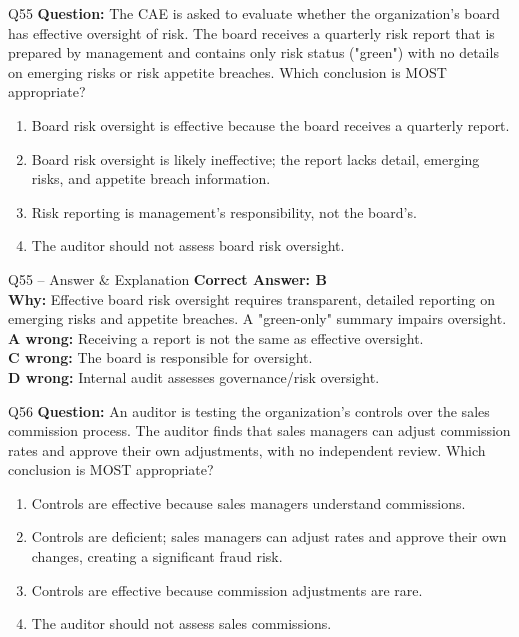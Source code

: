 \documentclass[aspectratio=169,10pt]{beamer}
\begin{document}
	\begin{frame}[t]{Q55}
		\small
		\textbf{Question:} The CAE is asked to evaluate whether the organization's board has effective oversight of risk. The board receives a quarterly risk report that is prepared by management and contains only risk status ("green") with no details on emerging risks or risk appetite breaches. Which conclusion is MOST appropriate?
		\begin{enumerate}[label=\Alph*.,itemsep=1pt,topsep=2pt]
			\item Board risk oversight is effective because the board receives a quarterly report.
			\item Board risk oversight is likely ineffective; the report lacks detail, emerging risks, and appetite breach information.
			\item Risk reporting is management's responsibility, not the board's.
			\item The auditor should not assess board risk oversight.
		\end{enumerate}
	\end{frame}
	
	\begin{frame}[t]{Q55 -- Answer \& Explanation}
		\small
		\textbf{Correct Answer: B} \\[4pt]
		\textbf{Why:} Effective board risk oversight requires transparent, detailed reporting on emerging risks and appetite breaches. A "green-only" summary impairs oversight. \\[4pt]
		\textbf{A wrong:} Receiving a report is not the same as effective oversight. \\[2pt]
		\textbf{C wrong:} The board is responsible for oversight. \\[2pt]
		\textbf{D wrong:} Internal audit assesses governance/risk oversight.
	\end{frame}
	
	\begin{frame}[t]{Q56}
		\small
		\textbf{Question:} An auditor is testing the organization's controls over the sales commission process. The auditor finds that sales managers can adjust commission rates and approve their own adjustments, with no independent review. Which conclusion is MOST appropriate?
		\begin{enumerate}[label=\Alph*.,itemsep=1pt,topsep=2pt]
			\item Controls are effective because sales managers understand commissions.
			\item Controls are deficient; sales managers can adjust rates and approve their own changes, creating a significant fraud risk.
			\item Controls are effective because commission adjustments are rare.
			\item The auditor should not assess sales commissions.
		\end{enumerate}
	\end{frame}
	
\end{document}
